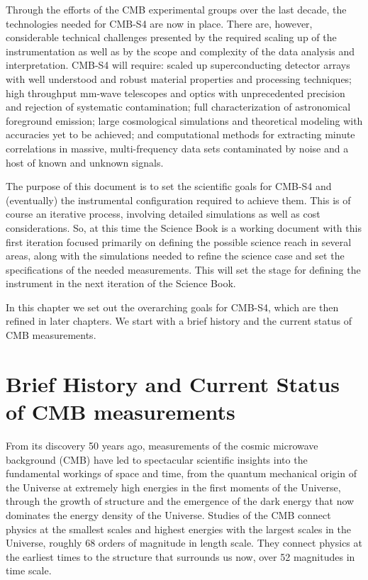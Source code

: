 Through the efforts of the CMB experimental groups over the last decade, the technologies needed for CMB-S4 are now in place. There are, however, considerable technical challenges presented by the required scaling up of the instrumentation as well as by the scope and complexity of the data analysis and interpretation.  CMB-S4 will require: scaled up superconducting detector arrays with well understood and robust material properties and processing techniques; high throughput mm-wave telescopes and optics with unprecedented precision and rejection of systematic contamination; full characterization of astronomical foreground emission; large cosmological simulations and theoretical modeling with accuracies yet to be achieved; and computational methods for extracting minute correlations in massive, multi-frequency data sets contaminated by noise and a host of known and unknown signals. 

The purpose of this document is to set the scientific goals for CMB-S4 and (eventually) the instrumental configuration required to achieve them.  This is of course an iterative process, involving detailed simulations as well as cost considerations. So, at this time the Science Book is a working document with this first iteration focused primarily on defining the possible science reach in several areas, along with the simulations needed to refine the science case and set the specifications of the needed measurements. This will set the stage for defining the instrument  in the next iteration of the Science Book. 

In this chapter we set out the overarching goals for CMB-S4, which are then refined in later chapters.  We start with a brief history and the current status of CMB measurements. 


\section{Brief History and Current Status of CMB measurements}
\label{sec:background}

From its discovery 50 years ago, measurements of the cosmic microwave background (CMB) have led to spectacular scientific insights into the fundamental workings of space and time, from the quantum mechanical origin of the Universe at extremely high energies in the first moments of the Universe, through the growth of structure and the emergence of the dark energy that now dominates the energy density of the Universe. Studies of the CMB connect physics at the smallest scales and highest energies with the largest scales in the Universe, roughly 68 orders of magnitude in length scale. They connect physics at the earliest times to the structure that surrounds us now, over 52 magnitudes in time scale. 

